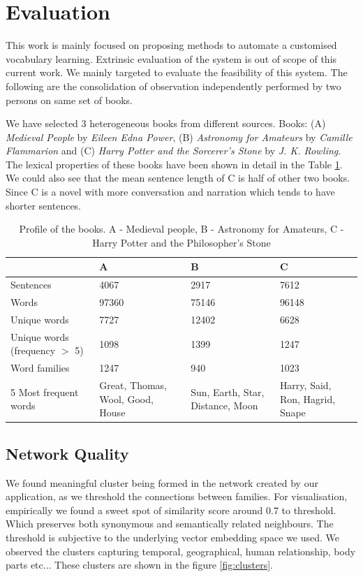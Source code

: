 \documentclass[11pt,a4paper]{article}
\begin{document}
\section{Evaluation}

This work is mainly focused on proposing methods to automate a customised vocabulary learning. Extrinsic evaluation of the system is out of scope of this current work. We mainly targeted to evaluate the feasibility of this system. The following are the consolidation of observation independently performed by two persons on same set of books.

We have selected 3 heterogeneous books from different sources. Books: (A) \textit{Medieval People} by \textit{Eileen Edna Power},  (B) \textit{Astronomy for Amateurs} by \textit{Camille Flammarion}  and (C) \textit{Harry Potter and the Sorcerer's Stone} by \textit{J. K. Rowling}. The lexical properties of these books have been shown in detail in the Table \ref{tab:book profile}. We could also see that the mean sentence length of C is half of other two books. Since C is a novel with more conversation and narration which tends to have shorter sentences.

\begin{table}{\textwidth}
\begin{tabular}[hbt!]{| p{5cm} | p{2cm} p{2cm} p{2cm} | }
\hline
   & A & B & C  \\
 \hline
 Sentences & 4067 & 2917 & 7612 \\ 
 Words & 97360 & 75146 & 96148 \\ 
Unique words & 7727  & 12402 & 6628 \\ 
 Unique words (frequency $>$ 5) & 1098 & 1399 & 1247 \\ 
 Word families & 1247 & 940 & 1023 \\ 
 5 Most frequent words & Great, Thomas, Wool, Good, House & Sun, Earth, Star, Distance, Moon & Harry, Said, Ron, Hagrid, Snape \\ 
 \hline
\end{tabular}
\caption{Profile of the books. A - Medieval people, B - Astronomy for Amateurs, C - Harry Potter and the Philosopher's Stone}
\label{tab:book profile}
\end{table}

\subsection{Network Quality}
We found meaningful cluster being formed in the network created by our application, as we threshold the connections between families. For visualisation, empirically we found a sweet spot of similarity score around 0.7 to threshold. Which preserves both synonymous and semantically related neighbours. The threshold is subjective to the underlying vector embedding space we used. We observed the clusters capturing temporal, geographical, human relationship, body parts etc... These clusters are shown in the figure \ref{fig:clusters}.
\end{document}
